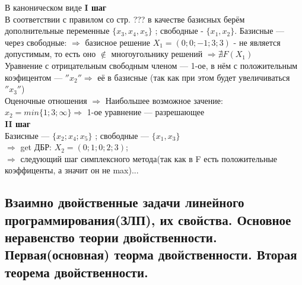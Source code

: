 В каноническом виде 
\textbf{I шаг}\\
В соответствии с правилом со стр. ??? в качестве базисных берём дополнительные переменные $\{x_3, x_4, x_5\}$ ; свободные - $\{x_1, x_2\}$. Базисные --- через свободные:
 $\Rightarrow$ базисное решение $X_1 = (0;0;-1;3;3)$ - не является допустимым, то есть оно $\notin$ многоугольнику решений $\Rightarrow \nexists F(X_1)$ \\
Уравнение с отрицательным свободным членом --- 1-ое, в нём с положительным коэфицентом --- $''x_2'' \Rightarrow $ её в базисные (так как при этом будет увеличиваться $''x_3''$) \\
Оценочные отношения $\Rightarrow$ Наибольшее возможное зачение: $x_2 = min \{1;3; \infty \} \Rightarrow$ 1-ое уравнение  --- разрешающее \\
\textbf{II шаг}\\
Базисные --- $\{x_2; x_4; x_5\}$ ; свободные --- $\{x_1, x_3\}$\\
$\Rightarrow$ get ДБР: $X_2=(0;1;0;2;3)$; \\
$\Rightarrow$ следующий шаг симплексного метода(так как в F есть положительные коэффиценты, а значит он не max)...
\subsection{Взаимно двойственные задачи линейного программирования(ЗЛП), их свойства. Основное неравенство теории двойственности. Первая(основная) теорма двойственности. Вторая теорема двойственности.}
